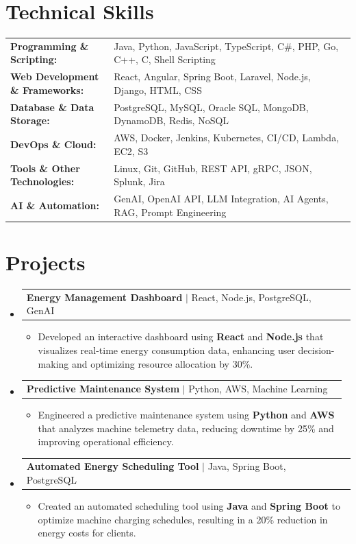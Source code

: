 \documentclass[letterpaper,10pt]{article}
\makeatletter
\newcommand{\resumeItem}[1]{
  \item{\fontsize{8pt}{9pt}\selectfont
    #1 \vspace{-3pt}
  }
}
\newcommand{\resumeProjectHeading}[2]{
    \item
    \begin{tabular*}{1.001\textwidth}{l@{\extracolsep{\fill}}r}
      \fontsize{8.5pt}{10pt}#1 & \textbf{\fontsize{8.5pt}{10pt} #2}\\
    \end{tabular*}\vspace{-7pt}
}
\newcommand{\resumeSubHeadingListStart}{\begin{itemize}[leftmargin=0pt, label={}]}
\newcommand{\resumeSubHeadingListEnd}{\end{itemize}}
\newcommand{\resumeItemListStart}{\begin{itemize}[leftmargin=*]}
\newcommand{\resumeItemListEnd}{\end{itemize}\vspace{-5pt}}
\makeatother
\begin{document}
\section{Technical Skills}
        \vspace{-14pt}
        \begin{table}[h]
            \fontsize{8pt}{9pt}\selectfont
            \begin{tabular}{p{0.3\linewidth} p{0.7\linewidth}}
                \textbf{Programming \& Scripting:} & Java, Python, JavaScript, TypeScript, C\#, PHP, Go, C++, C, Shell Scripting \\
                \textbf{Web Development \& Frameworks:} & React, Angular, Spring Boot, Laravel, Node.js, Django, HTML, CSS \\
                \textbf{Database \& Data Storage:} & PostgreSQL, MySQL, Oracle SQL, MongoDB, DynamoDB, Redis, NoSQL \\
                \textbf{DevOps \& Cloud:} & AWS, Docker, Jenkins, Kubernetes, CI/CD, Lambda, EC2, S3 \\
                \textbf{Tools \& Other Technologies:} & Linux, Git, GitHub, REST API, gRPC, JSON, Splunk, Jira \\
                \textbf{AI \& Automation:} & GenAI, OpenAI API, LLM Integration, AI Agents, RAG, Prompt Engineering \\
            \end{tabular}
        \end{table}
 \vspace{-18pt}

\section{Projects}
    \vspace{-5pt}
    \resumeSubHeadingListStart
          \resumeProjectHeading
            {\textbf{Energy Management Dashboard} $|$ React, Node.js, PostgreSQL, GenAI}{}
            \resumeItemListStart
                \resumeItem{Developed an interactive dashboard using \textbf{React} and \textbf{Node.js} that visualizes real-time energy consumption data, enhancing user decision-making and optimizing resource allocation by 30\%.}
            \resumeItemListEnd
        \vspace{-12pt}
    
        \resumeProjectHeading
            {\textbf{Predictive Maintenance System} $|$ Python, AWS, Machine Learning}{}
        \resumeItemListStart
                \resumeItem{Engineered a predictive maintenance system using \textbf{Python} and \textbf{AWS} that analyzes machine telemetry data, reducing downtime by 25\% and improving operational efficiency.}
        \resumeItemListEnd
      \vspace{-12pt}
      \resumeProjectHeading
        {\textbf{Automated Energy Scheduling Tool} $|$ Java, Spring Boot, PostgreSQL}{}
    \resumeItemListStart
            \resumeItem{Created an automated scheduling tool using \textbf{Java} and \textbf{Spring Boot} to optimize machine charging schedules, resulting in a 20\% reduction in energy costs for clients.}
    \resumeItemListEnd
    \resumeSubHeadingListEnd
\end{document}
